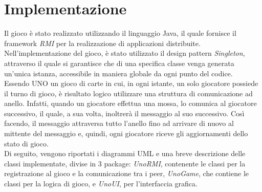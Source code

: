 \documentclass[11pt]{article} %
\begin{document}
\section{Implementazione}
Il gioco è stato realizzato utilizzando il linguaggio Java, il quale fornisce il framework \emph{RMI} per la realizzazione di applicazioni distribuite.
Nell'implementazione del gioco, è stato utilizzato il design pattern \emph{Singleton}, attraverso il quale si garantisce che di una specifica classe venga 
generata un'unica istanza, accessibile in maniera globale da ogni punto del codice.\\
Essendo UNO un gioco di carte in cui, in ogni istante, un solo giocatore possiede il turno di gioco, è risultato logico utilizzare una struttura di comunicazione
ad anello. Infatti, quando un giocatore effettua una mossa, lo comunica al giocatore successivo, il quale, a sua volta, inoltrerà il messaggio al suo successivo.
Così facendo, il messaggio attraversa tutto l'anello fino ad arrivare di nuovo al mittente del messaggio e, quindi, ogni giocatore riceve gli 
aggiornamenti dello stato di gioco.\\
Di seguito, vengono riportati i diagrammi UML e una breve descrizione delle classi implementate, divise in 3 package: \emph{UnoRMI}, contenente le classi per 
la registrazione al gioco e la comunicazione tra i peer, \emph{UnoGame}, che contiene le classi per la logica di gioco, e \emph{UnoUI}, per l'interfaccia 
grafica.
\end{document}
